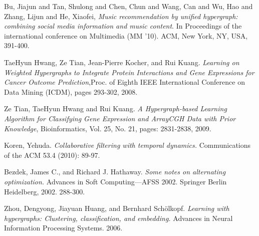 \documentclass[conference]{IEEEtran}
\begin{document}
\begin{thebibliography}{1}

Bu, Jiajun and Tan, Shulong and Chen, Chun and Wang, Can and Wu, Hao and Zhang, Lijun and He, Xiaofei,
\emph{Music recommendation by unified hypergraph: combining social media information and music content}.
In Proceedings of the international conference on Multimedia (MM '10). ACM, New York, NY, USA, 391-400.

TaeHyun Hwang, Ze Tian, Jean-Pierre Kocher, and Rui Kuang. \emph{Learning on Weighted Hypergraphs to Integrate Protein Interactions and Gene Expressions for Cancer Outcome Prediction},Proc. of Eighth IEEE International Conference on Data Mining (ICDM), pages 293-302, 2008.

Ze Tian, TaeHyun Hwang and Rui Kuang. \emph{A Hypergraph-based Learning Algorithm for Classifying Gene Expression and ArrayCGH Data with Prior Knowledge}, Bioinformatics, Vol. 25, No. 21, pages: 2831-2838, 2009. 

Koren, Yehuda. \emph{Collaborative filtering with temporal dynamics.} Communications of the ACM 53.4 (2010): 89-97.

Bezdek, James C., and Richard J. Hathaway. \emph{Some notes on alternating optimization.} Advances in Soft Computing—AFSS 2002. Springer Berlin Heidelberg, 2002. 288-300.

Zhou, Dengyong, Jiayuan Huang, and Bernhard Schölkopf. \emph{Learning with hypergraphs: Clustering, classification, and embedding.} Advances in Neural Information Processing Systems. 2006.

\end{thebibliography}
\end{document}
